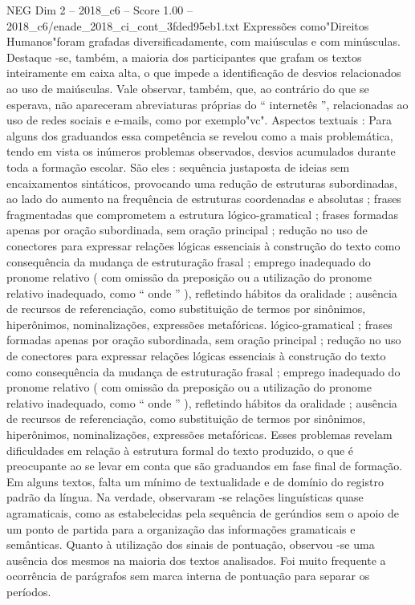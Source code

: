 \begin{textsample}{NEG Dim 2 – 2018\_c6 – Score 1.00 – 2018\_c6/enade\_2018\_ci\_cont\_3fded95eb1.txt}
Expressões como"Direitos Humanos"foram grafadas diversificadamente, com maiúsculas e com minúsculas.
Destaque -se, também, a maioria dos participantes que grafam os textos inteiramente em caixa alta, o que impede a identificação de desvios relacionados ao uso de maiúsculas.
Vale observar, também, que, ao contrário do que se esperava, não apareceram abreviaturas próprias do “ internetês ”, relacionadas ao uso de redes sociais e e-mails, como por exemplo"vc".
Aspectos textuais : Para alguns dos graduandos essa competência se revelou como a mais problemática, tendo em vista os inúmeros problemas observados, desvios acumulados durante toda a formação escolar.
São eles : sequência justaposta de ideias sem encaixamentos sintáticos, provocando uma redução de estruturas subordinadas, ao lado do aumento na frequência de estruturas coordenadas e absolutas ; frases fragmentadas que comprometem a estrutura lógico-gramatical ; frases formadas apenas por oração subordinada, sem oração principal ; redução no uso de conectores para expressar relações lógicas essenciais à construção do texto como consequência da mudança de estruturação frasal ; emprego inadequado do pronome relativo ( com omissão da preposição ou a utilização do pronome relativo inadequado, como “ onde ” ), refletindo hábitos da oralidade ; ausência de recursos de referenciação, como substituição de termos por sinônimos, hiperônimos, nominalizações, expressões metafóricas. lógico-gramatical ; frases formadas apenas por oração subordinada, sem oração principal ; redução no uso de conectores para expressar relações lógicas essenciais à construção do texto como consequência da mudança de estruturação frasal ; emprego inadequado do pronome relativo ( com omissão da preposição ou a utilização do pronome relativo inadequado, como “ onde ” ), refletindo hábitos da oralidade ; ausência de recursos de referenciação, como substituição de termos por sinônimos, hiperônimos, nominalizações, expressões metafóricas.
Esses problemas revelam dificuldades em relação à estrutura formal do texto produzido, o que é preocupante ao se levar em conta que são graduandos em fase final de formação.
Em alguns textos, falta um mínimo de textualidade e de domínio do registro padrão da língua.
Na verdade, observaram -se relações linguísticas quase agramaticais, como as estabelecidas pela sequência de gerúndios sem o apoio de um ponto de partida para a organização das informações gramaticais e semânticas.
Quanto à utilização dos sinais de pontuação, observou -se uma ausência dos mesmos na maioria dos textos analisados.
Foi muito frequente a ocorrência de parágrafos sem marca interna de pontuação para separar os períodos.

\end{textsample}
